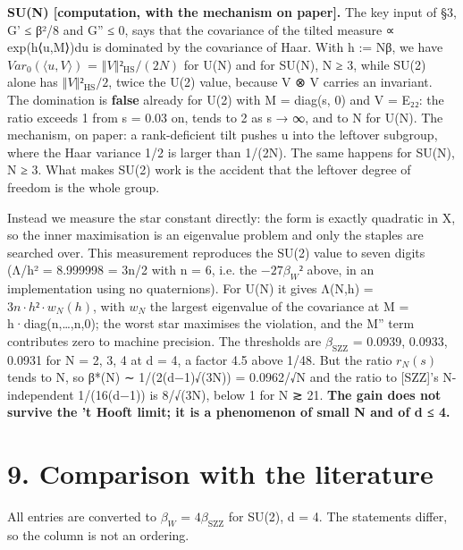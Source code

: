 \documentclass[11pt,a4paper]{article}
\theoremstyle{named}
\begin{document}
\textbf{SU(N) [computation, with the mechanism on paper].} The key input of §3, G' ≤ β²/8 and G'' ≤ 0, says that the covariance of the tilted measure ∝ exp(h⟨u,M⟩)du is dominated by the covariance of Haar. With h := Nβ, we have $Var_0(⟨u,V⟩)$ = $‖V‖²_{\mathrm{HS}}/(2N)$ for U(N) and for SU(N), N ≥ 3, while SU(2) alone has $‖V‖²_{\mathrm{HS}}/2$, twice the U(2) value, because V ⊗ V carries an invariant. The domination is \textbf{false} already for U(2) with M = diag(s, 0) and V = E₂₂: the ratio exceeds 1 from s = 0.03 on, tends to 2 as s → ∞, and to N for U(N). The mechanism, on paper: a rank-deficient tilt pushes u into the leftover subgroup, where the Haar variance 1/2 is larger than 1/(2N). The same happens for SU(N), N ≥ 3. What makes SU(2) work is the accident that the leftover degree of freedom is the whole group.

Instead we measure the star constant directly: the form is exactly quadratic in X, so the inner maximisation is an eigenvalue problem and only the staples are searched over. This measurement reproduces the SU(2) value to seven digits (Λ/h² = 8.999998 = 3n/2 with n = 6, i.e. the $−27β_W²$ above, in an implementation using no quaternions). For U(N) it gives Λ(N,h) = $3n·h²·w_N(h)$, with $w_N$ the largest eigenvalue of the covariance at M = h·diag(n,…,n,0); the worst star maximises the violation, and the M'' term contributes zero to machine precision. The thresholds are $β_{\mathrm{SZZ}}$ = 0.0939, 0.0933, 0.0931 for N = 2, 3, 4 at d = 4, a factor 4.5 above 1/48. But the ratio $r_N(s)$ tends to N, so β*(N) ∼ 1/(2(d−1)√(3N)) = 0.0962/√N and the ratio to [SZZ]'s N-independent 1/(16(d−1)) is 8/√(3N), below 1 for N ≳ 21. \textbf{The gain does not survive the 't Hooft limit; it is a phenomenon of small N and of d ≤ 4.}

\section*{9. Comparison with the literature}
All entries are converted to $β_W$ = $4β_{\mathrm{SZZ}}$ for SU(2), d = 4. The statements differ, so the column is not an ordering.
\end{document}
